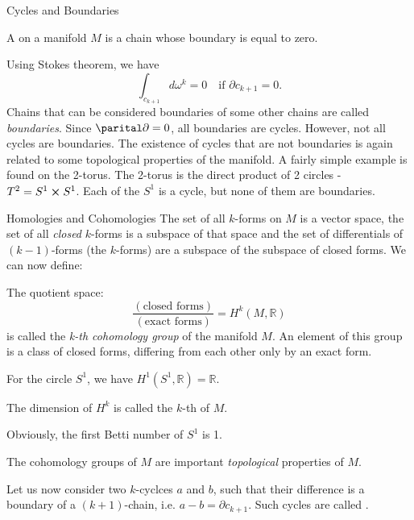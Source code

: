 \begin{subsubsection}{Cycles and Boundaries}
  \begin{definition}
    A  on a manifold $M$ is a chain whose boundary is equal to
    zero.
  \end{definition}
  Using Stokes theorem, we have
  \begin{equation}
    \int_{c_{k+1}}{d\omega^k} =0\quad \text{if } \partial c_{k+1} =0.
  \end{equation}
  Chains that can be considered boundaries of some other chains are called
  \textit{boundaries}. Since $\parital\partial = 0$, all boundaries are cycles.
  However, not all cycles are boundaries. The existence of cycles that are not
  boundaries is again related to some topological properties of the manifold.
  A fairly simple example is found on the 2-torus. The 2-torus is the direct
  product of 2 circles - $T^2=S^1\cross S^1$. Each of the $S^1$ is a cycle, but
  none of them are boundaries. 

  \begin{subsubsection}{Homologies and Cohomologies}
  The set of all $k$-forms on $M$ is a vector space, the set of all
  \textit{closed} $k$-forms is a subspace of that space and the set of
  differentials of $(k-1)$-forms (the  $k$-forms) are a subspace of
  the subspace of closed forms. We can now define:
  \begin{definition}
    The quotient space:
  \begin{equation}
    \frac{(\text{closed forms})}{(\text{exact forms})} = H^k(M,\mathbb{R})
  \end{equation}
    is called the \textit{k-th cohomology group} of the manifold $M$. An
    element of this group is a class of closed forms, differing from each other
    only by an exact form.
  \end{definition}
  For the circle $S^1$, we have $H^1(S^1,\mathbb{R}) = \mathbb{R}$.
  \begin{definition}
    The dimension of $H^k$ is called the $k$-th  of $M$.
  \end{definition}
  Obviously, the first Betti number of $S^1$ is 1. 
  \par The cohomology groups of $M$ are important \textit{topological}
  properties of $M$.

  \begin{definition}
  Let us now consider two $k$-cyclces $a$ and $b$, such that their 
  difference is a boundary of a $(k+1)$-chain, i.e. $a-b = \partial c_{k+1}$.
  Such cycles are called .


\end{definition}
\end{subsubsection}
\end{subsubsection}
